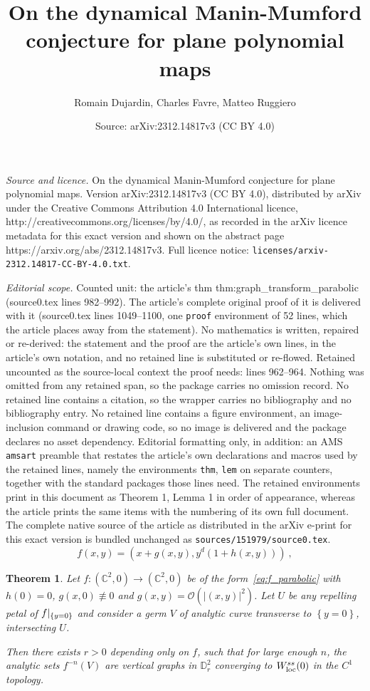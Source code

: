 \documentclass[10pt,a4paper]{amsart}
\title{On the dynamical Manin-Mumford conjecture for plane polynomial maps}
\author{Romain Dujardin, Charles Favre, Matteo Ruggiero}
\date{Source: arXiv:2312.14817v3 (CC BY 4.0)}
\newtheorem{thm}{Theorem}
\newcommand{\C}{\mathbb{C}}
\newcommand{\D}{\mathbb{D}}
\newcommand{\loc}{\mathrm{loc}}
\newcommand{\rest}[1]{ \arrowvert_{#1}}
\newcommand{\set}[1]{{\left\{#1\right\}}}
\begin{document}
\maketitle

\noindent\emph{Source and licence.} On the dynamical Manin-Mumford conjecture for plane polynomial maps. Version arXiv:2312.14817v3 (CC BY 4.0), distributed by arXiv under the Creative Commons Attribution 4.0 International licence, http://creativecommons.org/licenses/by/4.0/, as recorded in the arXiv licence metadata for this exact version and shown on the abstract page https://arxiv.org/abs/2312.14817v3. Full licence notice: \texttt{licenses/arxiv-2312.14817-CC-BY-4.0.txt}.\par\smallskip

\noindent\textit{Editorial scope.} Counted unit: the article's thm thm:graph\_transform\_parabolic (source0.tex lines 982--992). The article's complete original proof of it is delivered with it (source0.tex lines 1049--1100, one \texttt{proof} environment of 52 lines, which the article places away from the statement). No mathematics is written, repaired or re-derived: the statement and the proof are the article's own lines, in the article's own notation, and no retained line is substituted or re-flowed.  Retained uncounted as the source-local context the proof needs: lines 962--964.  Nothing was omitted from any retained span, so the package carries no omission record.  No retained line contains a citation, so the wrapper carries no bibliography and no bibliography entry.  No retained line contains a figure environment, an image-inclusion command or drawing code, so no image is delivered and the package declares no asset dependency.  Editorial formatting only, in addition: an AMS \texttt{amsart} preamble that restates the article's own declarations and macros used by the retained lines, namely the environments \texttt{thm}, \texttt{lem} on separate counters, together with the standard packages those lines need.  The retained environments print in this document as Theorem 1, Lemma 1 in order of appearance, whereas the article prints the same items with the numbering of its own full document.  The complete native source of the article as distributed in the arXiv e-print for this exact version is bundled unchanged as \texttt{sources/151979/source0.tex}.
\begin{equation}\label{eq:f_parabolic} 
f(x,y) =  \left(x + g(x,y) , y^d(1+h(x,y))\right)~,
\end{equation}

\begin{thm}\label{thm:graph_transform_parabolic} 
Let $f\colon(\C^2, 0) \to (\C^2, 0)$ 
  be of the form~\eqref{eq:f_parabolic} 
  with $h(0)=0$, $g(x,0)\not\equiv 0$ and $g(x,y) = \mathcal{O}(|(x,y)|^2)$. 
Let $U$ be any repelling petal of   
$f\rest{\set{y=0}}$ and consider a germ $V$ of analytic curve transverse 
to $\set{y=0}$, intersecting $U$.
 
Then there exists $r>0$  depending only on $f$, such that  for  large enough $n$, 
the analytic sets $f^{-n}(V)$ are   vertical graphs in $\D_r^2$  
converging  to $W^{\rm ss}_\loc(0)$ in the $C^1$ topology. \end{thm}
\end{document}
